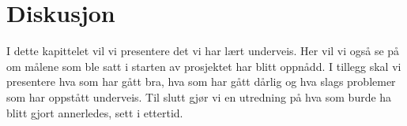 \cleardoublepage
\chapter{Diskusjon}
\label{chap:discussion} 

I dette kapittelet vil vi presentere det vi har lært underveis. Her vil vi også se på om målene som ble satt i starten av prosjektet har blitt oppnådd. I tillegg skal vi presentere hva som har gått bra, hva som har gått dårlig og hva slags problemer som har oppstått underveis. Til slutt gjør vi en utredning på hva som burde ha blitt gjort annerledes, sett i ettertid.






